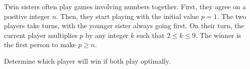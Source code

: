 Twin sisters often play games involving numbers together. 
First, they agree on a positive integer $n$. 
Then, they start playing with the initial value $p = 1$. 
The two players take turns, with the younger sister always going first. On their turn, the current player multiplies $p$ by any integer $k$ such that $2 \le k \le 9$.
The winner is the first person to make $p \ge n$.

Determine which player will win if both play optimally.